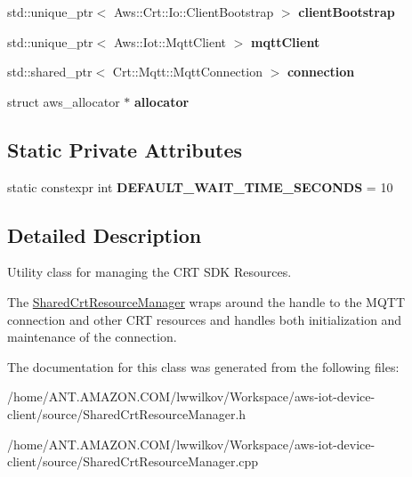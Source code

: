 \begin{DoxyCompactItemize}
std\+::unique\+\_\+ptr$<$ Aws\+::\+Crt\+::\+Io\+::\+Client\+Bootstrap $>$ {\bfseries client\+Bootstrap}
\item 
\mbox{\label{class_aws_1_1_iot_1_1_device_client_1_1_shared_crt_resource_manager_a3512db3a09f0f863d095786309a0e974}} 
std\+::unique\+\_\+ptr$<$ Aws\+::\+Iot\+::\+Mqtt\+Client $>$ {\bfseries mqtt\+Client}
\item 
\mbox{\label{class_aws_1_1_iot_1_1_device_client_1_1_shared_crt_resource_manager_ae0429ab9e338dfcf99d90f3192875e0d}} 
std\+::shared\+\_\+ptr$<$ Crt\+::\+Mqtt\+::\+Mqtt\+Connection $>$ {\bfseries connection}
\item 
\mbox{\label{class_aws_1_1_iot_1_1_device_client_1_1_shared_crt_resource_manager_aad4e62d3eee4c2388b25558444d03f40}} 
struct aws\+\_\+allocator $\ast$ {\bfseries allocator}
\end{DoxyCompactItemize}
\subsection*{Static Private Attributes}
\begin{DoxyCompactItemize}
\item 
\mbox{\label{class_aws_1_1_iot_1_1_device_client_1_1_shared_crt_resource_manager_a6a577cf49b11ae1ca725655e85389672}} 
static constexpr int {\bfseries D\+E\+F\+A\+U\+L\+T\+\_\+\+W\+A\+I\+T\+\_\+\+T\+I\+M\+E\+\_\+\+S\+E\+C\+O\+N\+DS} = 10
\end{DoxyCompactItemize}


\subsection{Detailed Description}
Utility class for managing the C\+RT S\+DK Resources. 

The \hyperlink{class_aws_1_1_iot_1_1_device_client_1_1_shared_crt_resource_manager}{Shared\+Crt\+Resource\+Manager} wraps around the handle to the M\+Q\+TT connection and other C\+RT resources and handles both initialization and maintenance of the connection. 

The documentation for this class was generated from the following files\+:\begin{DoxyCompactItemize}
\item 
/home/\+A\+N\+T.\+A\+M\+A\+Z\+O\+N.\+C\+O\+M/lwwilkov/\+Workspace/aws-\/iot-\/device-\/client/source/Shared\+Crt\+Resource\+Manager.\+h\item 
/home/\+A\+N\+T.\+A\+M\+A\+Z\+O\+N.\+C\+O\+M/lwwilkov/\+Workspace/aws-\/iot-\/device-\/client/source/Shared\+Crt\+Resource\+Manager.\+cpp\end{DoxyCompactItemize}
